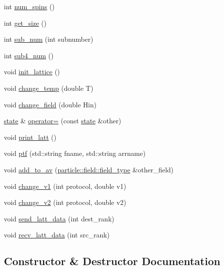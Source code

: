\begin{DoxyCompactItemize}
\item 
int \hyperlink{classstate_ad9182b875a7a3fb5981c811f7f062040}{num\+\_\+spins} ()
\item 
int \hyperlink{classstate_acf2ec1dfdb1068a279de590375cbcb96}{get\+\_\+size} ()
\item 
int \hyperlink{classstate_a8351befda232e04536d6a3e738754282}{sub\+\_\+num} (int subnumber)
\item 
int \hyperlink{classstate_a16e78a4e37048f5ba0eb049faa6a87f8}{sub4\+\_\+num} ()
\item 
void \hyperlink{classstate_acfeea4e197f5ce0160c6c664740ba6ff}{init\+\_\+lattice} ()
\item 
void \hyperlink{classstate_aca18a3757a2e6bd79cda366e4e31bb99}{change\+\_\+temp} (double T)
\item 
void \hyperlink{classstate_a3f54c8647fddb251db2ba11420f4e75f}{change\+\_\+field} (double Hin)
\item 
\hyperlink{classstate}{state} \& \hyperlink{classstate_a8f382a578a92617e7294cbbd80fba3c6}{operator=} (const \hyperlink{classstate}{state} \&other)
\item 
void \hyperlink{classstate_afa18f63b166492174bf88cd52c1cb748}{print\+\_\+latt} ()
\item 
void \hyperlink{classstate_af478dc8ce44c65cc535530738693eff5}{ptf} (std\+::string fname, std\+::string arrname)
\item 
void \hyperlink{classstate_a2d9073df186ccbf4159022d1c8c3b061}{add\+\_\+to\+\_\+av} (\hyperlink{classparticle_1_1field_1_1field__type}{particle\+::field\+::field\+\_\+type} \&other\+\_\+field)
\item 
void \hyperlink{classstate_a74588f49ec2b0868442d78ed9dcf1224}{change\+\_\+v1} (int protocol, double v1)
\item 
void \hyperlink{classstate_a9ffa7fbd21b542e66a9275f63b80ed0a}{change\+\_\+v2} (int protocol, double v2)
\item 
void \hyperlink{classstate_a6e35e024e6139032a54099bfe84a6fa4}{send\+\_\+latt\+\_\+data} (int dest\+\_\+rank)
\item 
void \hyperlink{classstate_a5ce0ea314795d1cc37849604f202fb98}{recv\+\_\+latt\+\_\+data} (int src\+\_\+rank)
\end{DoxyCompactItemize}


\subsection{Constructor \& Destructor Documentation}
